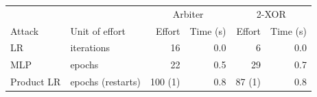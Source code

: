 \begin{tabular}{llrrrr}
\toprule
 & & \multicolumn{2}{c}{Arbiter} & \multicolumn{2}{c}{2-XOR} \\
Attack & Unit of effort & Effort & Time (s) & Effort & Time (s) \\
\midrule
LR & iterations & 16 & 0.0 & 6 & 0.0 \\
MLP & epochs & 22 & 0.5 & 29 & 0.7 \\
Product LR & epochs (restarts) & 100 (1) & 0.8 & 87 (1) & 0.8 \\
\bottomrule
\end{tabular}
